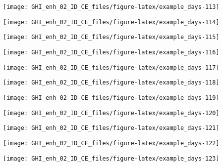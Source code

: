 \documentclass[
  10pt,
  a4paper,oneside]{article}
\begin{document}
\begin{center}\texttt{[image: GHI\_enh\_02\_ID\_CE\_files/figure-latex/example\_days-113]} \end{center}

\begin{center}\texttt{[image: GHI\_enh\_02\_ID\_CE\_files/figure-latex/example\_days-114]} \end{center}

\begin{center}\texttt{[image: GHI\_enh\_02\_ID\_CE\_files/figure-latex/example\_days-115]} \end{center}

\begin{center}\texttt{[image: GHI\_enh\_02\_ID\_CE\_files/figure-latex/example\_days-116]} \end{center}

\begin{center}\texttt{[image: GHI\_enh\_02\_ID\_CE\_files/figure-latex/example\_days-117]} \end{center}

\begin{center}\texttt{[image: GHI\_enh\_02\_ID\_CE\_files/figure-latex/example\_days-118]} \end{center}

\begin{center}\texttt{[image: GHI\_enh\_02\_ID\_CE\_files/figure-latex/example\_days-119]} \end{center}

\begin{center}\texttt{[image: GHI\_enh\_02\_ID\_CE\_files/figure-latex/example\_days-120]} \end{center}

\begin{center}\texttt{[image: GHI\_enh\_02\_ID\_CE\_files/figure-latex/example\_days-121]} \end{center}

\begin{center}\texttt{[image: GHI\_enh\_02\_ID\_CE\_files/figure-latex/example\_days-122]} \end{center}

\begin{center}\texttt{[image: GHI\_enh\_02\_ID\_CE\_files/figure-latex/example\_days-123]} \end{center}
\end{document}
